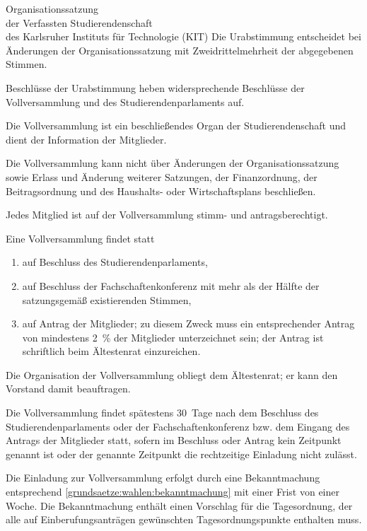 \begin{jurdoc}[Organisationssatzung]{Organisationssatzung\\der Verfassten Studierendenschaft\\des Karlsruher Instituts für Technologie (KIT)}
Die Urabstimmung entscheidet bei Änderungen der Organisationssatzung mit Zweidrittelmehrheit der abgegebenen Stimmen.

Beschlüsse der Urabstimmung heben widersprechende Beschlüsse der Vollversammlung und des Studierendenparlaments auf.

%
%



Die Vollversammlung ist ein beschließendes Organ der Studierendenschaft und dient der Information der Mitglieder.

Die Vollversammlung kann nicht über Änderungen der Organisationssatzung sowie Erlass und Änderung weiterer Satzungen, der Finanzordnung, der Beitragsordnung und des Haushalts- oder Wirtschaftsplans beschließen.


Jedes Mitglied ist auf der Vollversammlung stimm- und antragsberechtigt.

 \label{vv:zustandekommen}

Eine Vollversammlung findet statt
\begin{enumerate}
\item auf Beschluss des Studierendenparlaments,
\item auf Beschluss der Fachschaftenkonferenz mit mehr als der Hälfte der satzungsgemäß existierenden Stimmen,
\item \label{vv:zustandekommen:mitglieder}auf Antrag der Mitglieder; zu diesem Zweck muss ein entsprechender Antrag von mindestens 2~\% der Mitglieder unterzeichnet sein; der Antrag ist schriftlich beim Ältestenrat einzureichen.
\end{enumerate}


\label{vv:organisation}

Die Organisation der Vollversammlung obliegt dem Ältestenrat; er kann den Vorstand damit beauftragen.

Die Vollversammlung findet spätestens 30~Tage nach dem Beschluss des Studierendenparlaments oder der Fachschaftenkonferenz bzw. dem Eingang des Antrags der Mitglieder statt, sofern im Beschluss oder Antrag kein Zeitpunkt genannt ist oder der genannte Zeitpunkt die rechtzeitige Einladung nicht zulässt.

Die Einladung zur Vollversammlung erfolgt durch eine Bekanntmachung entsprechend \ref{grundsaetze:wahlen:bekanntmachung} mit einer Frist von einer Woche. Die Bekanntmachung enthält einen Vorschlag für die Tagesordnung, der alle auf Einberufungsanträgen gewünschten Tagesordnungspunkte enthalten muss.


\end{jurdoc}
